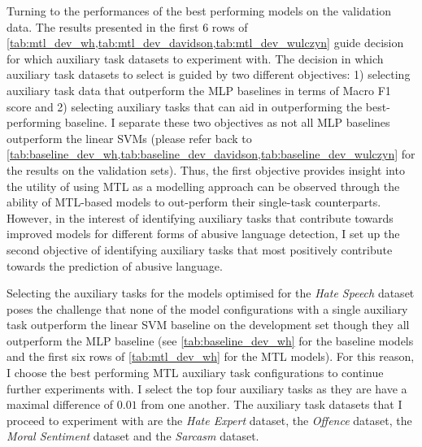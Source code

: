 Turning to the performances of the best performing models on the validation data.
The results presented in the first 6 rows of \cref{tab:mtl_dev_wh,tab:mtl_dev_davidson,tab:mtl_dev_wulczyn} guide decision for which auxiliary task datasets to experiment with.
The decision in which auxiliary task datasets to select is guided by two different objectives: 1) selecting auxiliary task data that outperform the MLP baselines in terms of Macro F1 score and 2) selecting auxiliary tasks that can aid in outperforming the best-performing baseline.
I separate these two objectives as not all MLP baselines outperform the linear SVMs (please refer back to \cref{tab:baseline_dev_wh,tab:baseline_dev_davidson,tab:baseline_dev_wulczyn} for the results on the validation sets).
Thus, the first objective provides insight into the utility of using MTL as a modelling approach can be observed through the ability of MTL-based models to out-perform their single-task counterparts.
However, in the interest of identifying auxiliary tasks that contribute towards improved models for different forms of abusive language detection, I set up the second objective of identifying auxiliary tasks that most positively contribute towards the prediction of abusive language.

Selecting the auxiliary tasks for the models optimised for the \textit{Hate Speech} dataset poses the challenge that none of the model configurations with a single auxiliary task outperform the linear SVM baseline on the development set though they all outperform the MLP baseline (see \cref{tab:baseline_dev_wh} for the baseline models and the first six rows of \cref{tab:mtl_dev_wh} for the MTL models).
For this reason, I choose the best performing MTL auxiliary task configurations to continue further experiments with.
I select the top four auxiliary tasks as they are have a maximal difference of $0.01$ from one another.
The auxiliary task datasets that I proceed to experiment with are the \textit{Hate Expert} dataset, the \textit{Offence} dataset, the \textit{Moral Sentiment} dataset and the \textit{Sarcasm} dataset.

